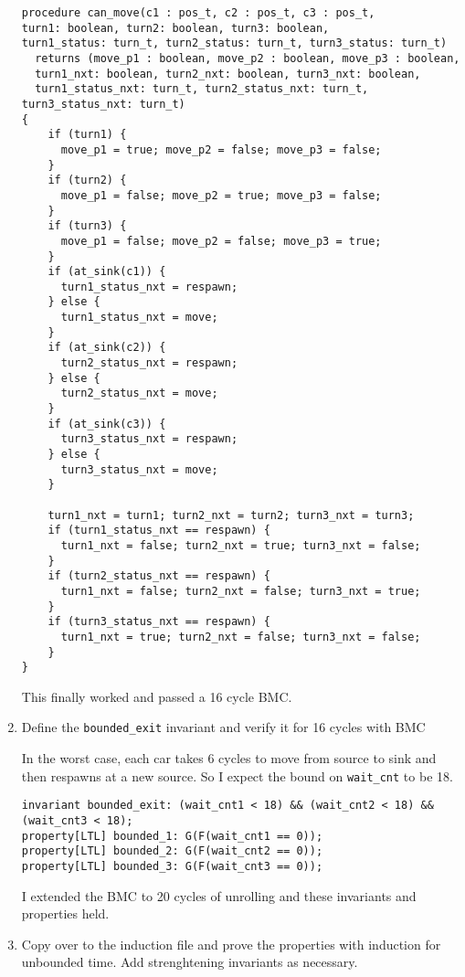 \begin{enumerate}[label=(\alph*)]
\begin{verbatim}
procedure can_move(c1 : pos_t, c2 : pos_t, c3 : pos_t,
turn1: boolean, turn2: boolean, turn3: boolean,
turn1_status: turn_t, turn2_status: turn_t, turn3_status: turn_t)
  returns (move_p1 : boolean, move_p2 : boolean, move_p3 : boolean,
  turn1_nxt: boolean, turn2_nxt: boolean, turn3_nxt: boolean,
  turn1_status_nxt: turn_t, turn2_status_nxt: turn_t, turn3_status_nxt: turn_t)
{
    if (turn1) {
      move_p1 = true; move_p2 = false; move_p3 = false;
    }
    if (turn2) {
      move_p1 = false; move_p2 = true; move_p3 = false;
    }
    if (turn3) {
      move_p1 = false; move_p2 = false; move_p3 = true;
    }
    if (at_sink(c1)) {
      turn1_status_nxt = respawn;
    } else {
      turn1_status_nxt = move;
    }
    if (at_sink(c2)) {
      turn2_status_nxt = respawn;
    } else {
      turn2_status_nxt = move;
    }
    if (at_sink(c3)) {
      turn3_status_nxt = respawn;
    } else {
      turn3_status_nxt = move;
    }

    turn1_nxt = turn1; turn2_nxt = turn2; turn3_nxt = turn3;
    if (turn1_status_nxt == respawn) {
      turn1_nxt = false; turn2_nxt = true; turn3_nxt = false;
    }
    if (turn2_status_nxt == respawn) {
      turn1_nxt = false; turn2_nxt = false; turn3_nxt = true;
    }
    if (turn3_status_nxt == respawn) {
      turn1_nxt = true; turn2_nxt = false; turn3_nxt = false;
    }
}
    \end{verbatim}

    This finally worked and passed a 16 cycle BMC.

  \item {\color{blue}Define the \verb|bounded_exit| invariant and verify it for 16 cycles with BMC}

    In the worst case, each car takes 6 cycles to move from source to sink and then respawns at a new source. So I expect the bound on \verb|wait_cnt| to be 18.

    \begin{verbatim}
invariant bounded_exit: (wait_cnt1 < 18) && (wait_cnt2 < 18) && (wait_cnt3 < 18);
property[LTL] bounded_1: G(F(wait_cnt1 == 0));
property[LTL] bounded_2: G(F(wait_cnt2 == 0));
property[LTL] bounded_3: G(F(wait_cnt3 == 0));
    \end{verbatim}

    I extended the BMC to 20 cycles of unrolling and these invariants and properties held.

  \item {\color{blue}Copy over to the induction file and prove the properties with induction for unbounded time. Add strenghtening invariants as necessary.}
\end{enumerate}

